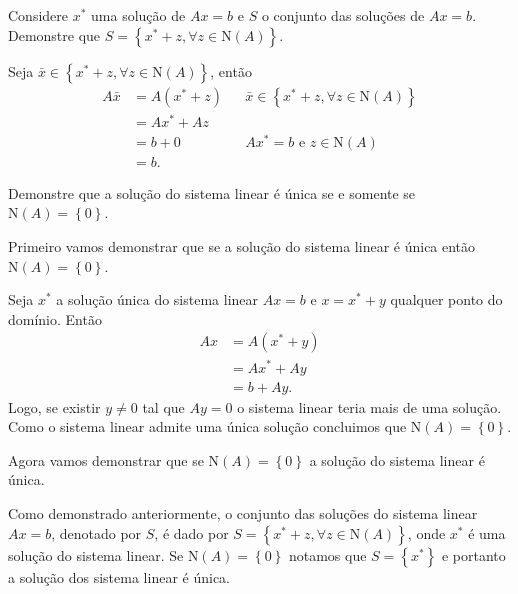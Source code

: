 \documentclass[a4paper,12pt, leqno, answers]{exam}
\newcommand{\EN}{\text{N}}
\begin{document}
\begin{questions}
    \question Considere $x^*$ uma solu\c{c}\~{a}o de $A x = b$ e $S$ o conjunto das solu\c{c}\~{o}es de $A x = b$. Demonstre que $S = \left\{ x^* + z, \forall z \in \EN (A) \right\}$.
    \begin{solution}
        Seja $\bar{x} \in \left\{ x^* + z, \forall z \in \EN (A) \right\}$, ent\~{a}o
        \begin{align*}
            A \bar{x} &= A \left( x^* + z \right) && \bar{x} \in \left\{ x^* + z, \forall z \in \EN (A) \right\} \\
            &= A x^* + A z \\
            &= b + 0 && A x^* = b \text{ e } z \in \EN (A) \\
            &= b.
        \end{align*}
    \end{solution}

    \question Demonstre que a solu\c{c}\~{a}o do sistema linear \'{e} \'{u}nica se e somente se $\EN (A) = \left\{ 0 \right\}$.
    \begin{solution}
        Primeiro vamos demonstrar que se a solu\c{c}\~{a}o do sistema linear \'{e} \'{u}nica ent\~{a}o $\EN (A) = \left\{ 0 \right\}$.

        Seja $x^*$ a solu\c{c}\~{a}o \'{u}nica do sistema linear $A x = b$ e $x = x^* + y$ qualquer ponto do dom\'{i}nio. Ent\~{a}o
        \begin{align*}
            A x &= A \left( x^* + y \right) \\
            &= A x^* + A y \\
            &= b + A y.
        \end{align*}
        Logo, se existir $y \neq 0$ tal que $A y = 0$ o sistema linear teria mais de uma solu\c{c}\~{a}o. Como o sistema linear admite uma \'{u}nica solu\c{c}\~{a}o concluimos que $\EN (A) = \left\{ 0 \right\}$.

        Agora vamos demonstrar que se $\EN (A) = \left\{ 0 \right\}$ a solu\c{c}\~{a}o do sistema linear \'{e} \'{u}nica.

        Como demonstrado anteriormente, o conjunto das solu\c{c}\~{o}es do sistema linear $A x = b$, denotado por $S$, \'{e} dado por $S = \left\{ x^* + z, \forall z \in \EN (A) \right\}$, onde $x^*$ \'{e} uma solu\c{c}\~{a}o do sistema linear. Se $\EN (A) = \left\{ 0 \right\}$ notamos que $S = \left\{ x^* \right\}$ e portanto a solu\c{c}\~{a}o dos sistema linear \'{e} \'{u}nica.
    \end{solution}


\end{questions}
\end{document}
